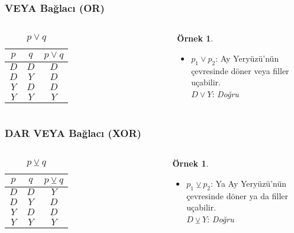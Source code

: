 \documentclass[dvipsnames]{beamer}
\theoremstyle{definition}
\theoremstyle{example}
\newtheorem{ornek}[theorem]{Örnek}
\theoremstyle{plain}
\begin{document}
\begin{frame}
  \frametitle{VEYA Bağlacı (OR)}

  \begin{columns}
    \begin{table}
      \caption{$p \vee q$}
      \begin{tabular}{|c|c||c|}\hline
        $p$ & $q$ & $p \vee q$\\\hline\hline
        $D$ & $D$ & $D$\\\hline
        $D$ & $Y$ & $D$\\\hline
        $Y$ & $D$ & $D$\\\hline
        $Y$ & $Y$ & $Y$\\\hline
      \end{tabular}
    \end{table}

    \pause
    \begin{ornek}
      \begin{itemize}
        \item $p_1 \vee p_2$: Ay Yeryüzü'nün çevresinde döner veya filler
          uçabilir.\\
          $D \vee Y$: \emph{Doğru}
      \end{itemize}
    \end{ornek}
  \end{columns}
\end{frame}

\begin{frame}
  \frametitle{DAR VEYA Bağlacı (XOR)}

  \begin{columns}
    \begin{table}
      \caption{$p \veebar q$}
      \begin{tabular}{|c|c||c|}\hline
        $p$ & $q$ & $p \veebar q$\\\hline\hline
        $D$ & $D$ & $Y$\\\hline
        $D$ & $Y$ & $D$\\\hline
        $Y$ & $D$ & $D$\\\hline
        $Y$ & $Y$ & $Y$\\\hline
      \end{tabular}
    \end{table}

    \pause
    \begin{ornek}
      \begin{itemize}
        \item $p_1 \veebar p_2$: Ya Ay Yeryüzü'nün çevresinde döner ya da filler
          uçabilir.\\
          $D \veebar Y$: \emph{Doğru}
      \end{itemize}
    \end{ornek}
  \end{columns}
\end{frame}
\end{document}
